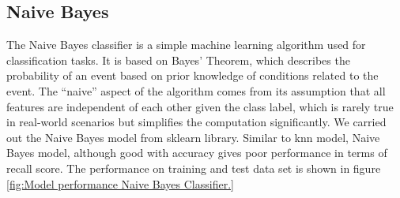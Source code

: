 \documentclass[12pt,a4paper]{article}
\begin{document}
	\subsection{Naive Bayes}
	The Naive Bayes classifier is a simple machine learning algorithm used for classification tasks. It is based on Bayes’ Theorem, which describes the probability of an event based on prior knowledge of conditions related to the event. The “naive” aspect of the algorithm comes from its assumption that all features are independent of each other given the class label, which is rarely true in real-world scenarios but simplifies the computation significantly. We carried out the Naive Bayes model from sklearn library. Similar to knn model, Naive Bayes model, although good with accuracy gives poor performance in terms of recall score. The performance on training and test data set is shown in figure \ref{fig:Model performance Naive Bayes Classifier.}
\end{document}
